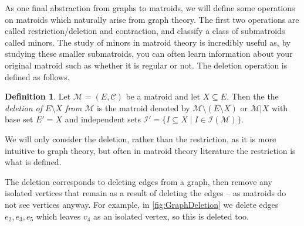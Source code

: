 \documentclass[12pt]{report}
\theoremstyle{definition}
\newtheorem{definition}[theorem]{Definition}
\def\calC{\mathcal C}
\def\calI{\mathcal I}
\def\calM{\mathcal M}
\theoremstyle{upright}
\begin{document}
As one final abstraction from graphs to matroids, we will define some operations on matroids which naturally arise from graph theory.
The first two operations are called restriction/deletion and contraction, and classify a class of submatroids called minors.
The study of minors in matroid theory is incredibly useful as, by studying these smaller submatroids, you can often learn information about your original matroid such as whether it is regular or not.
The deletion operation is defined as follows.

\begin{definition}

    Let $\calM=(E, \calC)$ be a matroid and let $X\subseteq E$.
    Then the the {\em deletion of $E\setminus X$ from $\calM$} is the matroid denoted by $\calM\setminus(E\setminus X)$ or $\calM|X$ with base set $E'=X$ and independent sets $\calI'=\{I\subseteq X\;|\;I\in\calI(\calM)\}$.
    
\end{definition}

We will only consider the deletion, rather than the restriction, as it is more intuitive to graph theory, but often in matroid theory literature the restriction is what is defined.

The deletion corresponds to deleting edges from a graph, then remove any isolated vertices that remain as a result of deleting the edges -- as matroids do not see vertices anyway.
For example, in \cref{fig:GraphDeletion} we delete edges $e_2, e_3, e_5$ which leaves $v_4$ as an isolated vertex, so this is deleted too.
\end{document}
